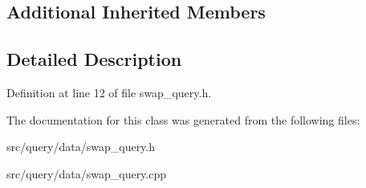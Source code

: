 \subsection*{Additional Inherited Members}


\subsection{Detailed Description}


Definition at line 12 of file swap\+\_\+query.\+h.



The documentation for this class was generated from the following files\+:\begin{DoxyCompactItemize}
\item 
src/query/data/swap\+\_\+query.\+h\item 
src/query/data/swap\+\_\+query.\+cpp\end{DoxyCompactItemize}
